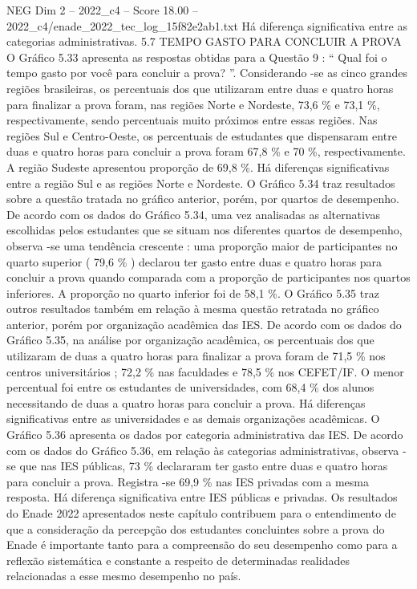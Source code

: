 \begin{textsample}{NEG Dim 2 – 2022\_c4 – Score 18.00 – 2022\_c4/enade\_2022\_tec\_log\_15f82e2ab1.txt}
Há diferença significativa entre as categorias administrativas. 5.7 TEMPO GASTO PARA CONCLUIR A PROVA O Gráfico 5.33 apresenta as respostas obtidas para a Questão 9 : “ Qual foi o tempo gasto por você para concluir a prova? ”.
Considerando -se as cinco grandes regiões brasileiras, os percentuais dos que utilizaram entre duas e quatro horas para finalizar a prova foram, nas regiões Norte e Nordeste, 73,6 \% e 73,1 \%, respectivamente, sendo percentuais muito próximos entre essas regiões.
Nas regiões Sul e Centro-Oeste, os percentuais de estudantes que dispensaram entre duas e quatro horas para concluir a prova foram 67,8 \% e 70 \%, respectivamente.
A região Sudeste apresentou proporção de 69,8 \%.
Há diferenças significativas entre a região Sul e as regiões Norte e Nordeste.
O Gráfico 5.34 traz resultados sobre a questão tratada no gráfico anterior, porém, por quartos de desempenho.
De acordo com os dados do Gráfico 5.34, uma vez analisadas as alternativas escolhidas pelos estudantes que se situam nos diferentes quartos de desempenho, observa -se uma tendência crescente : uma proporção maior de participantes no quarto superior ( 79,6 \% ) declarou ter gasto entre duas e quatro horas para concluir a prova quando comparada com a proporção de participantes nos quartos inferiores.
A proporção no quarto inferior foi de 58,1 \%.
O Gráfico 5.35 traz outros resultados também em relação à mesma questão retratada no gráfico anterior, porém por organização acadêmica das IES.
De acordo com os dados do Gráfico 5.35, na análise por organização acadêmica, os percentuais dos que utilizaram de duas a quatro horas para finalizar a prova foram de 71,5 \% nos centros universitários ; 72,2 \% nas faculdades e 78,5 \% nos CEFET/IF.
O menor percentual foi entre os estudantes de universidades, com 68,4 \% dos alunos necessitando de duas a quatro horas para concluir a prova.
Há diferenças significativas entre as universidades e as demais organizações acadêmicas.
O Gráfico 5.36 apresenta os dados por categoria administrativa das IES.
De acordo com os dados do Gráfico 5.36, em relação às categorias administrativas, observa -se que nas IES públicas, 73 \% declararam ter gasto entre duas e quatro horas para concluir a prova.
Registra -se 69,9 \% nas IES privadas com a mesma resposta.
Há diferença significativa entre IES públicas e privadas.
Os resultados do Enade 2022 apresentados neste capítulo contribuem para o entendimento de que a consideração da percepção dos estudantes concluintes sobre a prova do Enade é importante tanto para a compreensão do seu desempenho como para a reflexão sistemática e constante a respeito de determinadas realidades relacionadas a esse mesmo desempenho no país.

\end{textsample}
